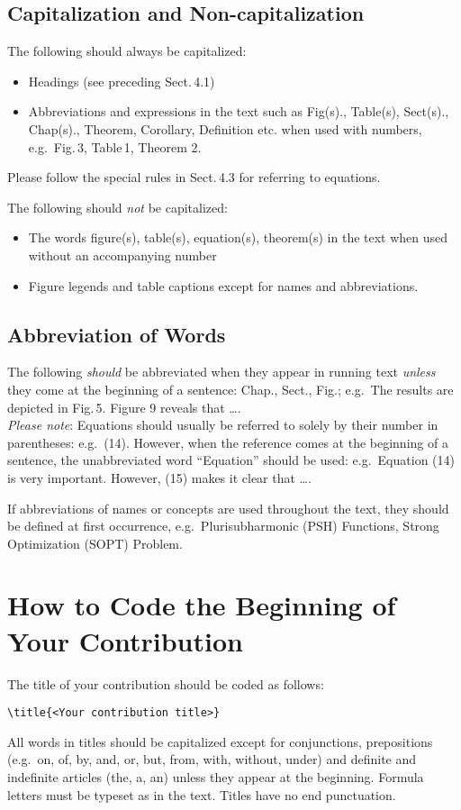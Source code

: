 \subsection{Capitalization and Non-capitalization}
%
\begin{alpherate}
\item
The following should always be capitalized:
\begin{itemize}
\item
Headings (see preceding Sect.\,4.1)
\item
Abbreviations and expressions
in the text such as  Fig(s)., Table(s), Sect(s)., Chap(s).,
Theorem, Corollary, Definition etc. when used with numbers, e.g.\
Fig.\,3, Table\,1, Theorem 2.
\end{itemize}
Please follow the special rules in Sect.\,4.3 for referring to
equations.
\item
The following should {\it not\/} be capitalized:
\begin{itemize}
\item
The words  figure(s), table(s), equation(s),
theorem(s) in the text when used without an accompanying number
\item
Figure legends and table captions except for names and
abbreviations.
\end{itemize}
\end{alpherate}
%
\subsection{Abbreviation of Words}
%
\begin{alpherate}
\item
The following {\it should} be abbreviated when they appear in running
text {\it unless\/} they come at the beginning of a sentence: Chap.,
Sect., Fig.; e.g.\ The results are depicted in Fig.\,5. Figure 9 reveals
that \dots .\\
{\it Please note\/}: Equations should usually be referred to solely by
their number in parentheses: e.g.\ (14). However, when the reference
comes at the beginning of a sentence, the unabbreviated word
``Equation'' should be used: e.g.\ Equation (14) is very important.
However, (15) makes it clear that \dots .
\item
If abbreviations of names or concepts are used
throughout the text, they should be defined at first occurrence,
e.g.\ Plurisubharmonic (PSH) Functions, Strong Optimization (SOPT)
Problem.
\end{alpherate}
%
\section{How to Code the Beginning of Your Contribution}
\label{contbegin}
%
The title of your contribution should be coded as follows:
\begin{verbatim}
\title{<Your contribution title>}
\end{verbatim}
All words in  titles should be capitalized except for
conjunctions, prepositions
(e.g.\ on, of, by, and, or, but,  from, with, without, under)
and definite and indefinite articles (the, a, an) unless they appear at
the beginning. Formula letters must be typeset as in the text.
Titles have no end punctuation.

